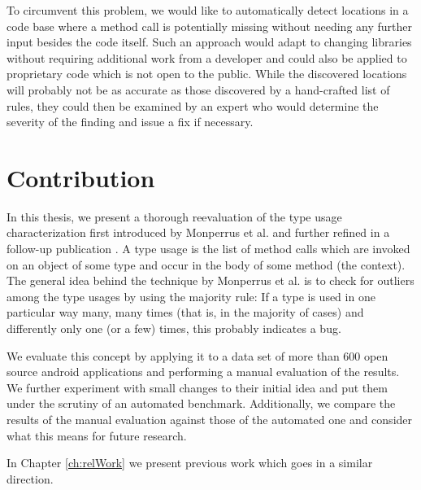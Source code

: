 To circumvent this problem, we would like to automatically detect locations in a code base where a method call is potentially missing without needing any further input besides the code itself.
Such an approach would adapt to changing libraries without requiring additional work from a developer and could also be applied to proprietary code which is not open to the public.
While the discovered locations will probably not be as accurate as those discovered by a hand-crafted list of rules, they could then be examined by an expert who would determine the severity of the finding and issue a fix if necessary.



\section{Contribution}

In this thesis, we present a thorough reevaluation of the type usage characterization first introduced by Monperrus et al. \cite{monperrus2010detecting} and further refined in a follow-up publication \cite{monperrus2013detecting}.
A type usage is the list of method calls which are invoked on an object of some type and occur in the body of some method (the context).
The general idea behind the technique by Monperrus et al. is to check for outliers among the type usages by using the majority rule:
If a type is used in one particular way many, many times (that is, in the majority of cases) and differently only one (or a few) times, this probably indicates a bug.

We evaluate this concept by applying it to a data set of more than 600 open source android applications and performing a manual evaluation of the results.
We further experiment with small changes to their initial idea and put them under the scrutiny of an automated benchmark.
Additionally, we compare the results of the manual evaluation against those of the automated one and consider what this means for future research.

In Chapter \ref{ch:relWork} we present previous work which goes in a similar direction.
